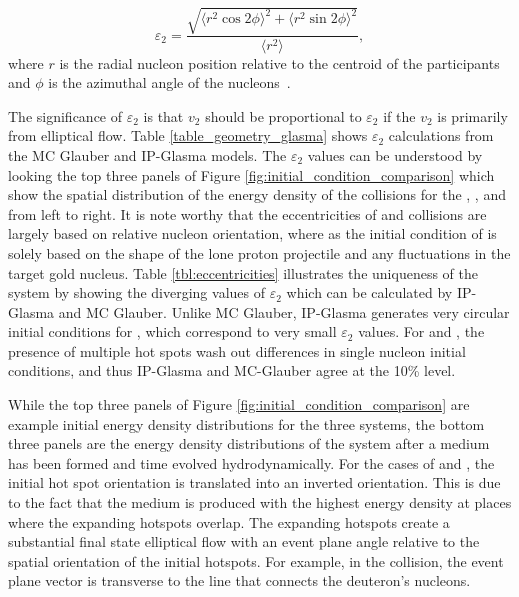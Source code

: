 \begin{equation}
\label{eqn:eccentricity_equation}
\varepsilon_2 = \frac{\sqrt{\langle r^2 \cos2\phi\rangle^2+\langle r^2 \sin2\phi\rangle^2}}{\langle r^2\rangle},
\end{equation}
where $r$ is the radial nucleon position relative to the centroid of the participants and $\phi$ is the azimuthal angle of the nucleons~\cite{PhysRevC.81.054905}. 

The significance of $\varepsilon_2$ is that $v_2$ should be proportional to $\varepsilon_2$ if the $v_2$ is primarily from elliptical flow. Table \ref{table_geometry_glasma} shows $\varepsilon_2$ calculations from the MC Glauber and IP-Glasma models. The $\varepsilon_2$ values can be understood by looking the top three panels of Figure \ref{fig:initial_condition_comparison} which show the spatial distribution of the energy density of the collisions for the \pau, \dau, and \hau from left to right. It is note worthy that the eccentricities of \dau and \hau collisions are largely based on relative nucleon orientation, where as the initial condition of \pau is solely based on the shape of the lone proton projectile and any fluctuations in the target gold nucleus. Table \ref{tbl:eccentricities} illustrates the uniqueness of the \pau system by showing the diverging values of $\varepsilon_2$ which can be calculated by IP-Glasma and MC Glauber. Unlike MC Glauber, IP-Glasma generates very circular initial conditions for \pau, which correspond to very small $\varepsilon_2$ values. For \dau and \hau, the presence of multiple hot spots wash out differences in single nucleon initial conditions, and thus IP-Glasma and MC-Glauber agree at the 10\% level. 

While the top three panels of Figure \ref{fig:initial_condition_comparison} are example initial energy density distributions for the three systems, the bottom three panels are the energy density distributions of the system after a medium has been formed and time evolved hydrodynamically. For the cases of \dau and \hau, the initial hot spot orientation is translated into an inverted orientation. This is due to the fact that the medium is produced with the highest energy density at places where the expanding hotspots overlap. The expanding hotspots create a substantial final state elliptical flow with an event plane angle relative to the spatial orientation of the initial hotspots. For example, in the \dau collision, the event plane vector is transverse to the line that connects the deuteron's nucleons. 

